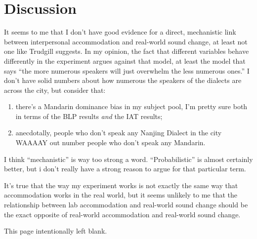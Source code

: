\chapter{Discussion}
\label{discussionchapter}

It seems to me that I don't have good evidence for a direct, mechanistic link between interpersonal accommodation and real-world sound change, at least not one like Trudgill suggests. In my opinion, the fact that different variables behave differently in the experiment argues against that model, at least the model that says ``the more numerous speakers will just overwhelm the less numerous ones.'' I don't have solid numbers about how numerous the speakers of the dialects are across the city, but consider that:

\begin{enumerate}
    \item there's a Mandarin dominance bias in my subject pool, I'm pretty sure both in terms of the BLP results \textit{and} the IAT results;
    \item anecdotally, people who don't speak any Nanjing Dialect in the city WAAAAY out number people who don't speak any Mandarin.
\end{enumerate}

I think ``mechanistic'' is way too strong a word. ``Probabilistic'' is almost certainly better, but i don't really have a strong reason to argue for that particular term.

It's true that the way my experiment works is not exactly the same way that accommodation works in the real world, but it seems unlikely to me that the relationship between lab accommodation and real-world sound change should be the exact opposite of real-world accommodation and real-world sound change.



\pagebreak

This page intentionally left blank.